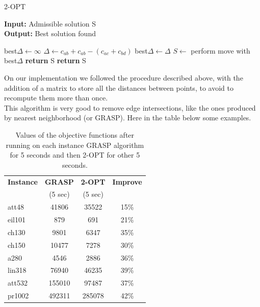 \begin{algorithm}
	\caption{2-OPT}\label{2-OPT method}
	\hspace*{\algorithmicindent} \textbf{Input:} Admissible solution S \\
	\hspace*{\algorithmicindent} \textbf{Output:} Best solution found
    \begin{algorithmic}[1]
			\State best$\Delta \leftarrow \infty$
				\State $\Delta \leftarrow c_{ab} + c_{ab} - (c_{ac} + c_{bd})$ 
					\State best$\Delta \leftarrow \Delta$
				\EndIf
			\EndFor
				\State $S \leftarrow$ perform move with best$\Delta$
			\Else
				\State \textbf{return} S
			\EndIf
		\EndWhile
		\State \textbf{return} S
    \end{algorithmic}
\end{algorithm}

\noindent On our implementation we followed the procedure described above, with the addition of a matrix to store all the distances between points, to avoid to recompute them more than once.\\
This algorithm is very good to remove edge intersections, like the ones produced  by nearest neighborhood (or GRASP). Here in the table below some examples.\\ 

\begin{table}[h!]
	\begin{center}
		\begin{tabular}{l|c|c|c}
			\textbf{Instance} & \textbf{GRASP} & \textbf{2-OPT} & \textbf{Improve}	\\
			& (5 sec) & (5 sec) & \\
			\hline
			att48 & 41806 & 35522 & 15\% \\
			eil101 & 879 & 691 & 21\% \\
			ch130 & 9801 & 6347 & 35\% \\
			ch150 & 10477 & 7278 & 30\% \\
			a280 & 4546 & 2886 & 36\% \\
			lin318 & 76940 & 46235 & 39\% \\ 
			att532 & 155010 & 97487 & 37\% \\	
			pr1002 & 492311 & 285078 & 42\% \\
		\end{tabular}
		\caption{Values of the objective functions after running on each instance GRASP algorithm for 5 seconds and then 2-OPT for other 5 seconds.}
	\end{center}
\end{table}


